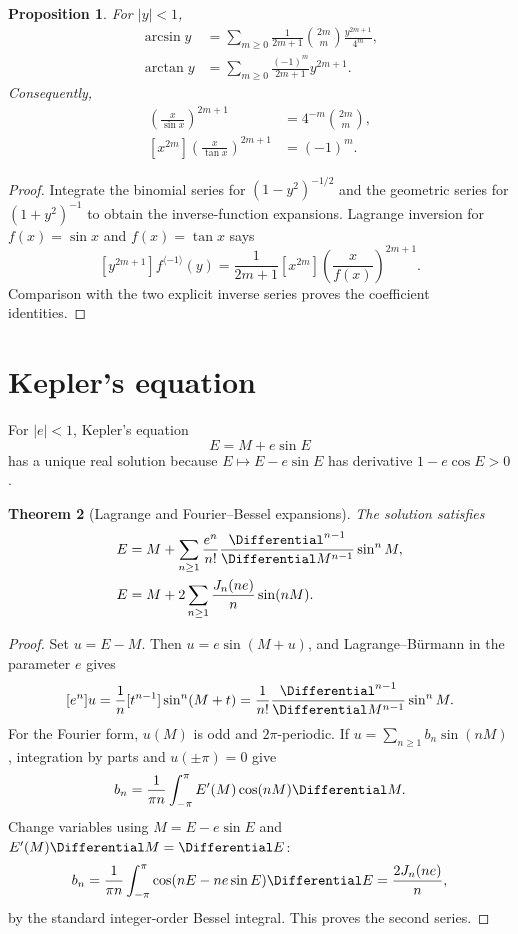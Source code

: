 \documentclass[11pt,a4paper,oneside,openany]{book}
\newtheorem{theorem}{Theorem}[chapter]
\newtheorem{proposition}[theorem]{Proposition}
\theoremstyle{definition}
\theoremstyle{remark}
\begin{document}
\begin{proposition}
For $|y|<1$,
\begin{align}
 \arcsin y&=\sum_{m\ge0}\frac1{2m+1}\binom{2m}{m}
 \frac{y^{2m+1}}{4^m},
 \label{unif:eq-arcsin-series}\\
 \arctan y&=\sum_{m\ge0}\frac{(-1)^m}{2m+1}y^{2m+1}.
 \label{unif:eq-arctan-series}
\end{align}
Consequently,
\begin{align}
 [x^{2m}]\left(\frac{x}{\sin x}\right)^{2m+1}
 &=4^{-m}\binom{2m}{m},
 \label{unif:eq-sine-power-coefficient}\\
 [x^{2m}]\left(\frac{x}{\tan x}\right)^{2m+1}
 &=(-1)^m.
 \label{unif:eq-tangent-power-coefficient}
\end{align}
\end{proposition}
\begin{proof}
Integrate the binomial series for $(1-y^2)^{-1/2}$ and the geometric series
for $(1+y^2)^{-1}$ to obtain the inverse-function expansions. Lagrange
inversion for $f(x)=\sin x$ and $f(x)=\tan x$ says
\[
 [y^{2m+1}]f^{\langle-1\rangle}(y)
 =\frac1{2m+1}[x^{2m}]\left(\frac{x}{f(x)}\right)^{2m+1}.
\]
Comparison with the two explicit inverse series proves the coefficient
identities.
\end{proof}

\section{Kepler's equation}

For $|e|<1$, Kepler's equation
\begin{equation}\label{unif:eq-kepler}
 E=M+e\sin E
\end{equation}
has a unique real solution because $E\mapsto E-e\sin E$ has derivative
$1-e\cos E>0$.

\begin{theorem}[Lagrange and Fourier--Bessel expansions]
\label{unif:thm-kepler-expansions}
The solution satisfies
\begin{align}
 E&=M+\sum_{n\ge1}\frac{e^n}{n!}
 \frac{\Differential^{n-1}}{\Differential M^{n-1}}\sin^nM,
 \label{unif:eq-kepler-lagrange}\\
 E&=M+2\sum_{n\ge1}\frac{J_n(ne)}{n}\sin(nM).
 \label{unif:eq-kepler-bessel}
\end{align}
\end{theorem}
\begin{proof}
Set $u=E-M$. Then $u=e\sin(M+u)$, and Lagrange--B\"urmann in the parameter
$e$ gives
\[
 [e^n]u=\frac1n[t^{n-1}]\sin^n(M+t)
 =\frac1{n!}\frac{\Differential^{n-1}}{\Differential M^{n-1}}\sin^nM.
\]
For the Fourier form, $u(M)$ is odd and $2\pi$-periodic. If
$u=\sum_{n\ge1}b_n\sin(nM)$, integration by parts and $u(\pm\pi)=0$ give
\[
 b_n=\frac1{\pi n}\int_{-\pi}^{\pi}E'(M)\cos(nM)\Differential M.
\]
Change variables using $M=E-e\sin E$ and $E'(M)\Differential M=\Differential E$:
\[
 b_n=\frac1{\pi n}\int_{-\pi}^{\pi}
 \cos(nE-ne\sin E)\Differential E=\frac{2J_n(ne)}n,
\]
by the standard integer-order Bessel integral. This proves the second series.
\end{proof}
\end{document}
